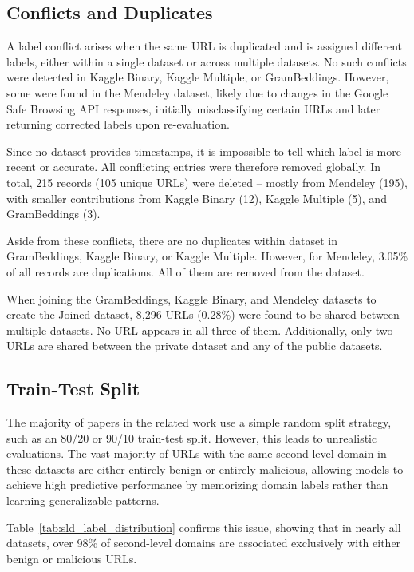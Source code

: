 \subsection{Conflicts and Duplicates}
A label conflict arises when the same URL is duplicated and is assigned different labels, either within a single dataset or across multiple datasets. No such conflicts were detected in Kaggle Binary, Kaggle Multiple, or GramBeddings. However, some were found in the Mendeley dataset, likely due to changes in the Google Safe Browsing API responses, initially misclassifying certain URLs and later returning corrected labels upon re-evaluation.

Since no dataset provides timestamps, it is impossible to tell which label is more recent or accurate. All conflicting entries were therefore removed globally. In total, 215 records (105 unique URLs) were deleted -- mostly from Mendeley (195), with smaller contributions from Kaggle Binary (12), Kaggle Multiple (5), and GramBeddings (3).

Aside from these conflicts, there are no duplicates within dataset in GramBeddings, Kaggle Binary, or Kaggle Multiple. However, for Mendeley, 3.05\% of all records are duplications. All of them are removed from the dataset.

When joining the GramBeddings, Kaggle Binary, and Mendeley datasets to create the Joined dataset, 8,296 URLs (0.28\%) were found to be shared between multiple datasets. No URL appears in all three of them. Additionally, only two URLs are shared between the private dataset and any of the public datasets.

\subsection{Train-Test Split}
\label{sec:train_test_split}
The majority of papers in the related work use a simple random split strategy, such as an 80/20 or 90/10 train-test split. However, this leads to unrealistic evaluations. The vast majority of URLs with the same second-level domain in these datasets are either entirely benign or entirely malicious, allowing models to achieve high predictive performance by memorizing domain labels rather than learning generalizable patterns.

Table~\ref{tab:sld_label_distribution} confirms this issue, showing that in nearly all datasets, over 98\% of second-level domains are associated exclusively with either benign or malicious URLs.

